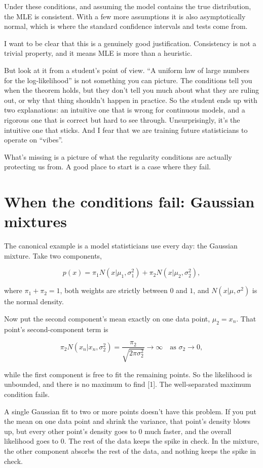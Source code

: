 \documentclass{article}
\begin{document}
Under these conditions, and assuming the model contains the true distribution, the MLE is consistent. With a few more assumptions it is also asymptotically normal, which is where the standard confidence intervals and tests come from.

I want to be clear that this is a genuinely good justification. Consistency is not a trivial property, and it means MLE is more than a heuristic.

But look at it from a student's point of view. ``A uniform law of large numbers for the log-likelihood'' is not something you can picture. The conditions tell you when the theorem holds, but they don't tell you much about what they are ruling out, or why that thing shouldn't happen in practice. So the student ends up with two explanations: an intuitive one that is wrong for continuous models, and a rigorous one that is correct but hard to see through. Unsurprisingly, it's the intuitive one that sticks. And I fear that we are training future statisticians to operate on ``vibes''.

What's missing is a picture of what the regularity conditions are actually protecting us from. A good place to start is a case where they fail.

\section{When the conditions fail: Gaussian mixtures}

The canonical example is a model statisticians use every day: the Gaussian mixture. Take two components,

\[p(x)=\pi_1 N(x|\mu_1,\sigma_1^2)+\pi_2 N(x|\mu_2,\sigma_2^2),\]

where $\pi_1+\pi_2=1$, both weights are strictly between $0$ and $1$, and $N(x|\mu,\sigma^2)$ is the normal density.

Now put the second component's mean exactly on one data point, $\mu_2 = x_n$. That point's second-component term is

\[\pi_2 N(x_n|x_n,\sigma_2^2)=\frac{\pi_2}{\sqrt{2\pi\sigma_2^2}} \to \infty \quad\text{as } \sigma_2\to 0,\]

while the first component is free to fit the remaining points. So the likelihood is unbounded, and there is no maximum to find [1]. The well-separated maximum condition fails.

A single Gaussian fit to two or more points doesn't have this problem. If you put the mean on one data point and shrink the variance, that point's density blows up, but every other point's density goes to $0$ much faster, and the overall likelihood goes to $0$. The rest of the data keeps the spike in check. In the mixture, the other component absorbs the rest of the data, and nothing keeps the spike in check.
\end{document}
